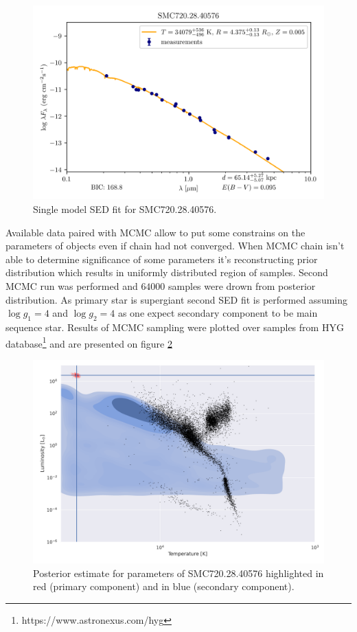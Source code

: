 \documentclass{pracalicmgr}
\begin{document}
\begin{figure}[H]
    \centering
    \includegraphics[scale=1]{plots/SMC720.28.40576_simple_emcee.png}
    \caption{Single model SED fit for SMC720.28.40576.}
    \label{SMC720:sed}
\end{figure}
Available data paired with MCMC allow to put some constrains on the parameters of objects even if chain had not converged. 
When MCMC chain isn't able to determine significance of some parameters it's reconstructing prior distribution 
which results in uniformly distributed region of samples. Second MCMC run was performed and $64000$ samples were drown from 
posterior distribution. 
As primary star is supergiant second SED fit is performed assuming $\log g_1=4$ and $\log g_2=4$ as one expect secondary component to be 
main sequence star. 
Results of MCMC sampling were plotted over samples from HYG
database\footnote{https://www.astronexus.com/hyg} and are presented on figure \ref{posterior}
\begin{figure}[H]
    \includegraphics[scale=0.6]{plots/posterior_estimate_SMC720.png}
    \caption{Posterior estimate for parameters of SMC720.28.40576 highlighted in red (primary component)
    and in blue (secondary component).}\label{posterior}
\end{figure}
\end{document}
